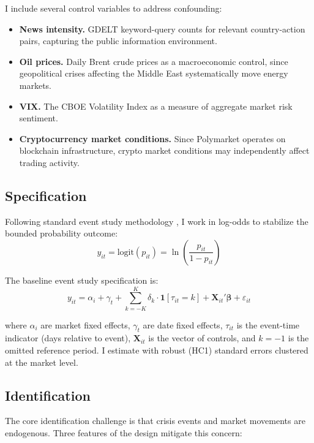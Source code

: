 \documentclass[12pt]{article}
\begin{document}
I include several control variables to address confounding:
\begin{itemize}
    \item \textbf{News intensity.} GDELT keyword-query counts for relevant country-action pairs, capturing the public information environment.
    \item \textbf{Oil prices.} Daily Brent crude prices as a macroeconomic control, since geopolitical crises affecting the Middle East systematically move energy markets.
    \item \textbf{VIX.} The CBOE Volatility Index as a measure of aggregate market risk sentiment.
    \item \textbf{Cryptocurrency market conditions.} Since Polymarket operates on blockchain infrastructure, crypto market conditions may independently affect trading activity.
\end{itemize}

\subsection{Specification}

Following standard event study methodology \citep{mackinlay1997}, I work in log-odds to stabilize the bounded probability outcome:
\begin{equation}
y_{it} = \text{logit}(p_{it}) = \ln\left(\frac{p_{it}}{1 - p_{it}}\right)
\end{equation}

The baseline event study specification is:
\begin{equation}\label{eq:eventstudy}
y_{it} = \alpha_i + \gamma_t + \sum_{k=-K}^{K} \delta_k \cdot \mathbf{1}[\tau_{it} = k] + \mathbf{X}_{it}'\boldsymbol{\beta} + \varepsilon_{it}
\end{equation}

where $\alpha_i$ are market fixed effects, $\gamma_t$ are date fixed effects, $\tau_{it}$ is the event-time indicator (days relative to event), $\mathbf{X}_{it}$ is the vector of controls, and $k = -1$ is the omitted reference period. I estimate with robust (HC1) standard errors clustered at the market level.

\subsection{Identification}

The core identification challenge is that crisis events and market movements are endogenous. Three features of the design mitigate this concern:
\end{document}
